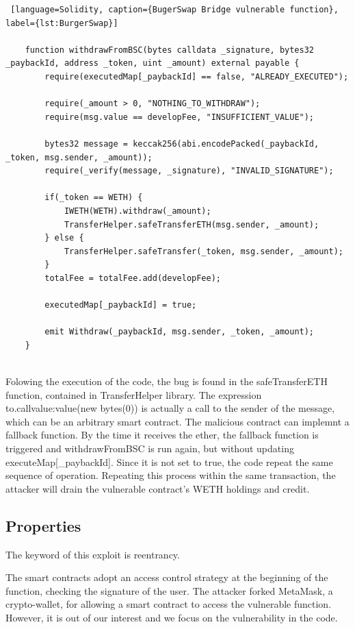\begin{lstlisting} [language=Solidity, caption={BugerSwap Bridge vulnerable function}, label={lst:BurgerSwap}]

    function withdrawFromBSC(bytes calldata _signature, bytes32 _paybackId, address _token, uint _amount) external payable {
        require(executedMap[_paybackId] == false, "ALREADY_EXECUTED");
        
        require(_amount > 0, "NOTHING_TO_WITHDRAW");
        require(msg.value == developFee, "INSUFFICIENT_VALUE");
        
        bytes32 message = keccak256(abi.encodePacked(_paybackId, _token, msg.sender, _amount));
        require(_verify(message, _signature), "INVALID_SIGNATURE");
        
        if(_token == WETH) {
            IWETH(WETH).withdraw(_amount);
            TransferHelper.safeTransferETH(msg.sender, _amount);
        } else {
            TransferHelper.safeTransfer(_token, msg.sender, _amount);
        }
        totalFee = totalFee.add(developFee);
        
        executedMap[_paybackId] = true;
        
        emit Withdraw(_paybackId, msg.sender, _token, _amount);
    }
    
\end{lstlisting}

Folowing the execution of the code, the bug is found in the safeTransferETH function, contained in TransferHelper library. 
The expression to.call{value:value}(new bytes(0)) is actually a call to the sender of the message, which can be an arbitrary smart contract. 
The malicious contract can implemnt a fallback function. By the time it receives the ether, the fallback function is 
triggered and withdrawFromBSC is run again, but without updating executeMap[\_paybackId]. 
Since it is not set to true, the code repeat the same sequence of operation. 
Repeating this process within the same transaction, the attacker will drain the vulnerable contract's WETH holdings and credit.

\subsection{Properties}
The keyword of this exploit is reentrancy. 

The smart contracts adopt an access control strategy at the beginning of the function, checking the signature of the user. 
The attacker forked MetaMask, a crypto-wallet, for allowing a smart contract to 
access the vulnerable function. However, it is out of our interest and we focus on the vulnerability in the code.


